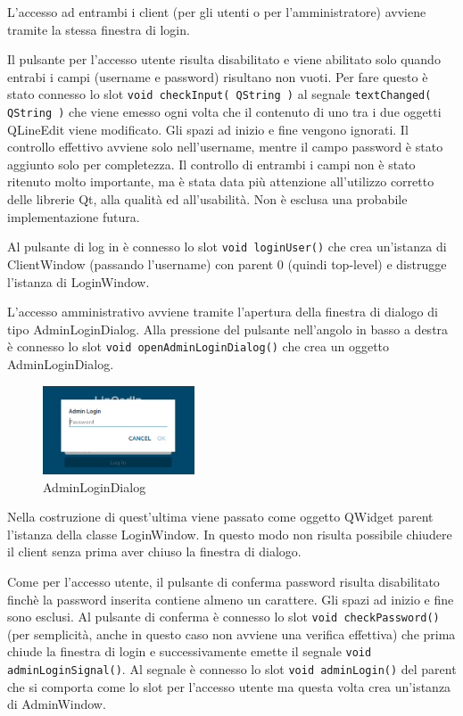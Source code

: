 \documentclass[a4paper]{article}
\begin{document}
L'accesso ad entrambi i client (per gli utenti o per l'amministratore) avviene tramite la stessa finestra di login.

Il pulsante per l'accesso utente risulta disabilitato e viene abilitato solo quando entrabi i campi (username e password) risultano non vuoti. Per fare questo è stato connesso lo slot \texttt{void checkInput( QString )} al segnale \texttt{textChanged( QString )} che viene emesso ogni volta che il contenuto di uno tra i due oggetti QLineEdit viene modificato. Gli spazi ad inizio e fine vengono ignorati. Il controllo effettivo avviene solo nell'username, mentre il campo password è stato aggiunto solo per completezza. Il controllo di entrambi i campi non è stato ritenuto molto importante, ma è stata data più attenzione all'utilizzo corretto delle librerie Qt, alla qualità ed all'usabilità. Non è esclusa una probabile implementazione futura.

Al pulsante di log in è connesso lo slot \texttt{void loginUser()} che crea un'istanza di ClientWindow (passando l'username) con parent 0 (quindi top-level) e distrugge l'istanza di LoginWindow.

L'accesso amministrativo avviene tramite l'apertura della finestra di dialogo di tipo AdminLoginDialog. Alla pressione del pulsante nell'angolo in basso a destra è connesso lo slot \texttt{void openAdminLoginDialog()} che crea un oggetto AdminLoginDialog.

\begin{figure}[!ht]
\centering
\caption{AdminLoginDialog}
\includegraphics[width=0.4\textwidth]{AdminLoginDialog.png}
\end{figure}

Nella costruzione di quest'ultima viene passato come oggetto QWidget parent l'istanza della classe LoginWindow. In questo modo non risulta possibile chiudere il client senza prima aver chiuso la finestra di dialogo.

Come per l'accesso utente, il pulsante di conferma password risulta disabilitato finchè la password inserita contiene almeno un carattere. Gli spazi ad inizio e fine sono esclusi. Al pulsante di conferma è connesso lo slot \texttt{void checkPassword()} (per semplicità, anche in questo caso non avviene una verifica effettiva) che prima chiude la finestra di login e successivamente emette il segnale \texttt{void adminLoginSignal()}. Al segnale è connesso lo slot \texttt{void adminLogin()} del parent che si comporta come lo slot per l'accesso utente ma questa volta crea un'istanza di AdminWindow.
\end{document}
